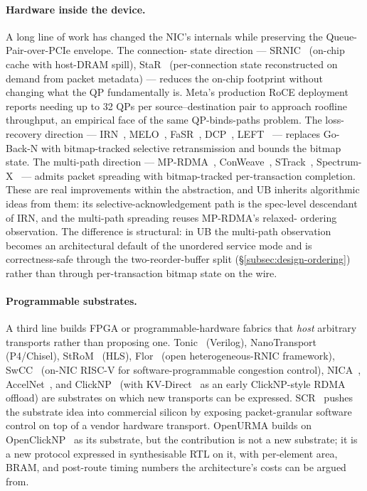 \documentclass[10pt,twocolumn]{article}
\begin{document}
\paragraph{Hardware inside the device.}
A long line of work has changed the NIC's internals while
preserving the Queue-Pair-over-PCIe envelope. The connection-
state direction --- SRNIC~\cite{wang2023:srnic} (on-chip cache
with host-DRAM spill), StaR~\cite{wang2021:star} (per-connection
state reconstructed on demand from packet metadata) --- reduces
the on-chip footprint without changing what the QP fundamentally
is. Meta's production RoCE deployment~\cite{gangidi2024:metaroce}
reports needing up to 32 QPs per source--destination pair to
approach roofline throughput, an empirical face of the same
QP-binds-paths problem. The loss-recovery
direction --- IRN~\cite{mittal2018:irn},
MELO~\cite{lu2017:melo}, FaSR~\cite{huang2024:fasr},
DCP~\cite{li2025:dcp}, LEFT~\cite{huang2024:left} --- replaces
Go-Back-N with bitmap-tracked selective retransmission and
bounds the bitmap state. The multi-path direction ---
MP-RDMA~\cite{lu2018:mprdma}, ConWeave~\cite{tan2023:conweave},
STrack~\cite{strack2024}, Spectrum-X~\cite{nvidia:spectrumx} ---
admits packet spreading with bitmap-tracked per-transaction
completion. These are real improvements within the abstraction,
and UB inherits algorithmic ideas from them: its
selective-acknowledgement path is the spec-level descendant of
IRN, and the multi-path spreading reuses MP-RDMA's relaxed-
ordering observation. The difference is structural: in UB the
multi-path observation becomes an architectural default of the
unordered service mode and is correctness-safe through the
two-reorder-buffer split (\S\ref{subsec:design-ordering}) rather
than through per-transaction bitmap state on the wire.

\paragraph{Programmable substrates.}
A third line builds FPGA or programmable-hardware fabrics that
\emph{host} arbitrary transports rather than proposing one.
Tonic~\cite{arashloo2020:tonic} (Verilog),
NanoTransport~\cite{ibanez2021:nanotransport} (P4/Chisel),
StRoM~\cite{strom-eurosys20} (HLS), Flor~\cite{li2023:flor}
(open heterogeneous-RNIC framework), SwCC~\cite{huang2025:swcc}
(on-NIC RISC-V for software-programmable congestion control),
NICA~\cite{nica:atc19}, AccelNet~\cite{firestone2018:accelnet},
and ClickNP~\cite{li2016:clicknp} (with KV-Direct~\cite{kvdirect}
as an early ClickNP-style RDMA offload) are substrates on which
new transports can be expressed. SCR~\cite{zhao2025:scr} pushes
the substrate idea into commercial silicon by exposing
packet-granular software control on top of a vendor hardware
transport. OpenURMA builds on OpenClickNP~\cite{openclicknp} as
its substrate, but the contribution is not a new substrate; it
is a new protocol expressed in synthesisable RTL on it, with
per-element area, BRAM, and post-route timing numbers the
architecture's costs can be argued from.
\end{document}
